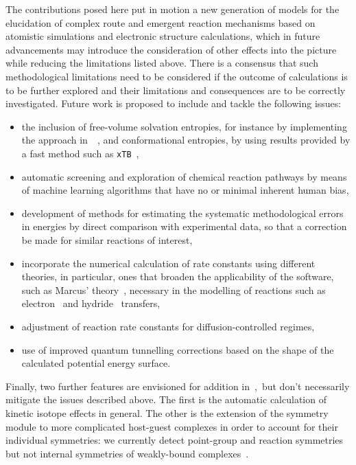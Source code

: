 The contributions posed here put in motion a new generation
of models for the elucidation of complex route and emergent reaction mechanisms
based on atomistic simulations and electronic structure calculations,
which in future advancements may introduce the consideration of other effects into the picture
while reducing the limitations listed above.
There is a consensus that such methodological limitations need
to be considered if the outcome of calculations is to be further explored
and their limitations and consequences are to be correctly investigated.
Future work is proposed to include and tackle the following issues:
%
\begin{itemize}
	\item the inclusion of free-volume solvation entropies, for instance
	      by implementing the approach in~\citeauthor{Garza_2019}~\cite{Garza_2019},
	      and conformational entropies, by using results provided by a fast method such as \texttt{xTB}~\cite{Bannwarth_2020},
	\item automatic screening and exploration of chemical reaction pathways
	      by means of machine learning algorithms that have no or minimal inherent human bias,
	\item development of methods for estimating the systematic methodological errors in energies
	      by direct comparison with experimental data, so that a correction be made for similar reactions of interest,
	\item incorporate the numerical calculation of rate constants using different theories,
	      in particular, ones that broaden the applicability of the software,
	      such as Marcus' theory~\cite{Miller_1984,Nobel_1992,Nikbin_2012},
	      necessary in the modelling of reactions
	      such as electron~\cite{Miller_1984} and hydride~\cite{Nikbin_2012} transfers,
	\item adjustment of reaction rate constants for diffusion-controlled regimes,
	\item use of improved quantum tunnelling corrections based on the shape of the calculated potential energy surface.
\end{itemize}

Finally, two further features are envisioned for addition in~\overreact{},~but don't necessarily mitigate the issues described above.
The first is the automatic calculation of kinetic isotope effects in general.
The other is the extension of the symmetry module to more complicated host-guest complexes
in order to account for their individual symmetries:
we currently detect point-group and reaction symmetries but not internal symmetries
of weakly-bound complexes~\cite{Gilson_2010}.
